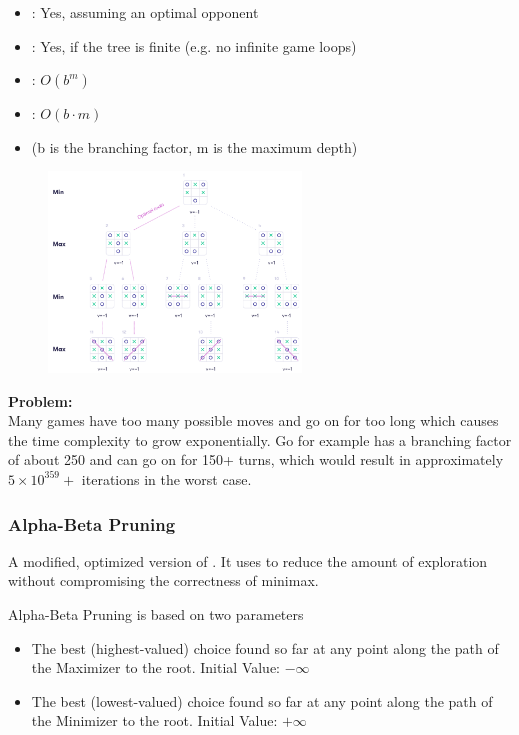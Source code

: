 \documentclass[
../../EiKI_Summary.tex,
]
{subfiles}
\begin{document}
\begin{defbox}
    [Characteristics]
    \begin{itemize}
        \item {}: Yes, assuming an optimal opponent
        \item {}: Yes, if the tree is finite (e.g. no infinite game loops)
        \item {}: $O(b^m)$
        \item {}: $O(b\cdot m)$
        \item (b is the branching factor, m is the maximum depth)
    \end{itemize}
\end{defbox}

\begin{figure}[H]
    \centering
    \includegraphics[width=0.6\textwidth]{Pics/04/MinimaxEx.png}
\end{figure}

\textbf{Problem:}\\
Many games have too many possible moves and go on for too long which causes the time complexity to grow exponentially. Go for example has a branching factor of about 250 and can go on for 150+ turns, which would result in approximately $5\times 10^{359} +$ iterations in the worst case. 

\subsubsection{Alpha-Beta Pruning}
\begin{defbox*}
    A modified, optimized version of . It uses  to reduce the amount of exploration without compromising the correctness of minimax.
\end{defbox*}

Alpha-Beta Pruning is based on two parameters
\begin{itemize}
    \item {} The best (highest-valued) choice found so far at any point along the path of the Maximizer to the root. Initial Value: $-\infty$
    \item {} The best (lowest-valued) choice found so far at any point along the path of the Minimizer to the root. Initial Value: $+\infty$ 
\end{itemize}
\end{document}
